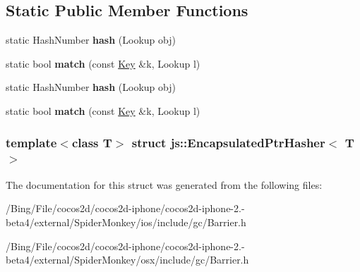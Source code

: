\subsection*{Static Public Member Functions}
\begin{DoxyCompactItemize}
\item 
\hypertarget{structjs_1_1_encapsulated_ptr_hasher_ad25ab8c7413c2277c002489769d95801}{static Hash\-Number {\bfseries hash} (Lookup obj)}\label{structjs_1_1_encapsulated_ptr_hasher_ad25ab8c7413c2277c002489769d95801}

\item 
\hypertarget{structjs_1_1_encapsulated_ptr_hasher_a2221426a0f39399de201972db7b165b5}{static bool {\bfseries match} (const \hyperlink{classjs_1_1_encapsulated_ptr}{Key} \&k, Lookup l)}\label{structjs_1_1_encapsulated_ptr_hasher_a2221426a0f39399de201972db7b165b5}

\item 
\hypertarget{structjs_1_1_encapsulated_ptr_hasher_ad25ab8c7413c2277c002489769d95801}{static Hash\-Number {\bfseries hash} (Lookup obj)}\label{structjs_1_1_encapsulated_ptr_hasher_ad25ab8c7413c2277c002489769d95801}

\item 
\hypertarget{structjs_1_1_encapsulated_ptr_hasher_a2221426a0f39399de201972db7b165b5}{static bool {\bfseries match} (const \hyperlink{classjs_1_1_encapsulated_ptr}{Key} \&k, Lookup l)}\label{structjs_1_1_encapsulated_ptr_hasher_a2221426a0f39399de201972db7b165b5}

\end{DoxyCompactItemize}
\subsubsection*{template$<$class T$>$ struct js\-::\-Encapsulated\-Ptr\-Hasher$<$ T $>$}



The documentation for this struct was generated from the following files\-:\begin{DoxyCompactItemize}
\item 
/\-Bing/\-File/cocos2d/cocos2d-\/iphone/cocos2d-\/iphone-\/2.-\/beta4/external/\-Spider\-Monkey/ios/include/gc/Barrier.\-h\item 
/\-Bing/\-File/cocos2d/cocos2d-\/iphone/cocos2d-\/iphone-\/2.-\/beta4/external/\-Spider\-Monkey/osx/include/gc/Barrier.\-h\end{DoxyCompactItemize}
